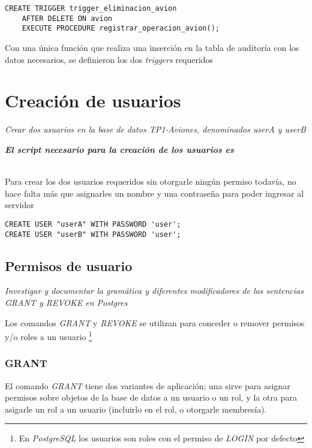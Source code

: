 \lstset{style=sql}
\begin{lstlisting}
CREATE TRIGGER trigger_eliminacion_avion 
    AFTER DELETE ON avion
    EXECUTE PROCEDURE registrar_operacion_avion();
\end{lstlisting}

Con una única función que realiza una inserción en la tabla de auditoría con los datos necesarios, se definieron los dos \emph{triggers} requeridos 

\section{Creación de usuarios}
\emph{Crear dos usuarios en la base de datos TP1-Aviones, denominados userA y userB} 

\emph{\textbf{El script necesario para la creación de los usuarios es }} 


~\\

Para crear los dos usuarios requeridos sin otorgarle ningún permiso todavía, no hace falta más que asignarles un nombre y una contraseña para poder ingresar al servidor

\vspace*{5mm}
\lstset{style=sql}
\begin{lstlisting}
CREATE USER "userA" WITH PASSWORD 'user';
CREATE USER "userB" WITH PASSWORD 'user';
\end{lstlisting}

\subsection{Permisos de usuario}
\emph{Investigar y documentar la gramática y diferentes modificadores de las sentencias GRANT y REVOKE en Postgres} 

Los comandos \emph{GRANT} \cite{grant} y \emph{REVOKE} \cite{revoke} se utilizan para conceder o remover permisos y/o roles a un usuario \footnote{En \emph{PostgreSQL} los usuarios son roles con el permiso de \emph{LOGIN} por defecto}   

\subsubsection{GRANT}

El comando \emph{GRANT} tiene dos variantes de aplicación; una sirve para asignar permisos sobre objetos de la base de datos a un usuario o un rol, y la otra para asigarle un rol a un usuario (incluirlo en el rol, o otorgarle membresía).

